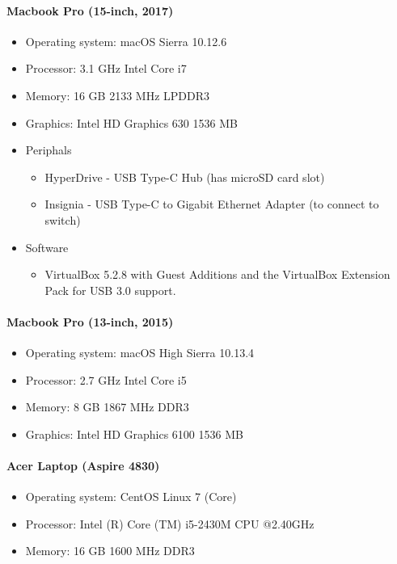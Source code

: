 \paragraph{Macbook Pro (15-inch, 2017)}
\begin{itemize}
\item Operating system: macOS Sierra 10.12.6 
\item Processor: 3.1 GHz Intel Core i7
\item Memory: 16 GB 2133 MHz LPDDR3
\item Graphics: Intel HD Graphics 630 1536 MB
\item Periphals
\begin{itemize}
\item HyperDrive - USB Type-C Hub (has microSD card slot)
\item Insignia - USB Type-C to Gigabit Ethernet Adapter (to connect to switch)
\end{itemize}
\item Software
\begin{itemize}
\item VirtualBox 5.2.8 with Guest Additions and the VirtualBox Extension Pack for USB 3.0 support.
\end{itemize}
\end{itemize}

\paragraph{Macbook Pro (13-inch, 2015)}
\begin{itemize}
	\item Operating system: macOS High Sierra 10.13.4 
	\item Processor: 2.7 GHz Intel Core i5
	\item Memory: 8 GB 1867 MHz DDR3
	\item Graphics: Intel HD Graphics 6100 1536 MB
\end{itemize}

\paragraph{Acer Laptop (Aspire 4830)}
\begin{itemize}
	\item Operating system: CentOS Linux 7 (Core)
	\item Processor: Intel (R) Core (TM) i5-2430M CPU @2.40GHz
	\item Memory: 16 GB 1600 MHz DDR3
\end{itemize}

